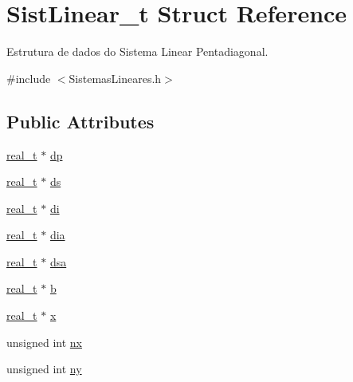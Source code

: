 \hypertarget{structSistLinear__t}{}\section{Sist\+Linear\+\_\+t Struct Reference}
\label{structSistLinear__t}


Estrutura de dados do Sistema Linear Pentadiagonal.  




{\ttfamily \#include $<$Sistemas\+Lineares.\+h$>$}

\subsection*{Public Attributes}
\begin{DoxyCompactItemize}
\item 
\hyperlink{SistemasLineares_8h_a0d00e2b3dfadee81331bbb39068570c4}{real\+\_\+t} $\ast$ \hyperlink{structSistLinear__t_aa7f879f3d335e7973af826bc65df4a49}{dp}
\item 
\hyperlink{SistemasLineares_8h_a0d00e2b3dfadee81331bbb39068570c4}{real\+\_\+t} $\ast$ \hyperlink{structSistLinear__t_add986d7f6004231eee2d838e7bc7596b}{ds}
\item 
\hyperlink{SistemasLineares_8h_a0d00e2b3dfadee81331bbb39068570c4}{real\+\_\+t} $\ast$ \hyperlink{structSistLinear__t_a86345c5459d538c556dba797dccfede7}{di}
\item 
\hyperlink{SistemasLineares_8h_a0d00e2b3dfadee81331bbb39068570c4}{real\+\_\+t} $\ast$ \hyperlink{structSistLinear__t_ac61f29d6df1c08a55d9d571fcb82bf53}{dia}
\item 
\hyperlink{SistemasLineares_8h_a0d00e2b3dfadee81331bbb39068570c4}{real\+\_\+t} $\ast$ \hyperlink{structSistLinear__t_a02d4791c1278b1a6a2796617e43fe29b}{dsa}
\item 
\hyperlink{SistemasLineares_8h_a0d00e2b3dfadee81331bbb39068570c4}{real\+\_\+t} $\ast$ \hyperlink{structSistLinear__t_a5f554632eec68e5e0dbea0058c9657ac}{b}
\item 
\hyperlink{SistemasLineares_8h_a0d00e2b3dfadee81331bbb39068570c4}{real\+\_\+t} $\ast$ \hyperlink{structSistLinear__t_a106437fbdef1dee46d7b1c34509e0da1}{x}
\item 
unsigned int \hyperlink{structSistLinear__t_a0f02ce66276316fd835180cf6a033001}{nx}
\item 
unsigned int \hyperlink{structSistLinear__t_a84d8f1f84f050ca4dfc93a4ceaef2b9a}{ny}
\end{DoxyCompactItemize}


